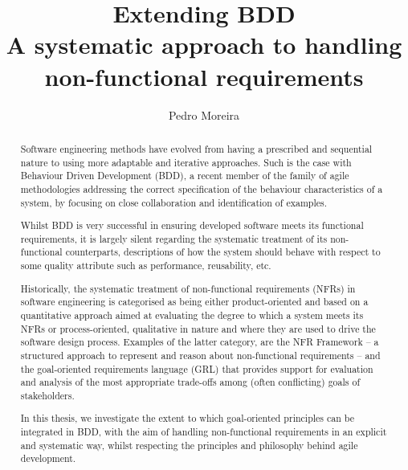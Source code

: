 \documentclass[dissertation,final]{softeng}
\title{Extending BDD\\A systematic approach to handling non-functional requirements}
\author{Pedro Moreira}
\begin{document}
\maketitle


\begin{abstract}
Software engineering methods have evolved from having a prescribed and sequential nature to using more adaptable and iterative approaches. Such is the case with Behaviour Driven Development (BDD), a recent member of the family of agile methodologies addressing the correct specification of the behaviour characteristics of a system, by focusing on close collaboration and identification of examples.

Whilst BDD is very successful in ensuring developed software meets its functional requirements, it is largely silent regarding the systematic treatment of its non-functional counterparts, descriptions of how the system should behave with respect to some quality attribute such as performance, reusability, etc.

Historically, the systematic treatment of non-functional requirements (NFRs) in software engineering is categorised as being either product-oriented and based on a quantitative approach aimed at evaluating the degree to which a system meets its NFRs or process-oriented, qualitative in nature and where they are used to drive the software design process. Examples of the latter category, are the NFR Framework -- a structured approach to represent and reason about non-functional requirements -- and the goal-oriented requirements language (GRL) that provides support for evaluation and analysis of the most appropriate trade-offs among (often conflicting) goals of stakeholders. 

In this thesis, we investigate the extent to which goal-oriented principles can be integrated in BDD, with the aim of handling non-functional requirements in an explicit and systematic way, whilst respecting the principles and philosophy behind agile development.
\end{abstract}

\clearpage

\begin{acknowledgements}
\end{acknowledgements}
\end{document}
